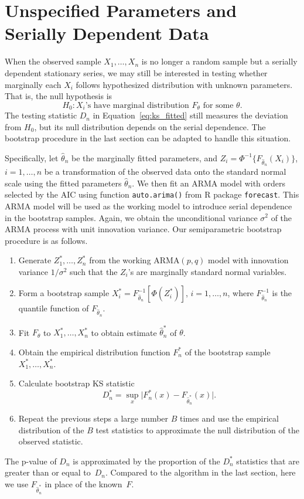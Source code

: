 \documentclass[12pt, letterpaper, titlepage]{article}
\begin{document}
\section{Unspecified Parameters and Serially Dependent Data}
\label{sec:fittedwithdependence}

When the observed sample $X_1, \ldots, X_n$ is no longer a random sample but
a serially dependent stationary series, we may still be interested in testing
whether marginally each $X_i$ follows hypothesized distribution with unknown
parameters. That is, the null hypothesis is
\[
H_0: \text{$X_i$'s have marginal distribution $F_\theta$ for some $\theta$}.
\]
The testing statistic $D_n$ in Equation~\eqref{eq:ks_fitted} still measures the
deviation from $H_0$, but its null distribution depends on the serial
dependence. The bootstrap procedure in the last section can be adapted to handle
this situation.


Specifically, let $\hat\theta_n$ be the marginally fitted parameters, and
$Z_i = \Phi^{-1} \{F_{\hat\theta_n}(X_i)\}$, $i = 1, \ldots, n$ be a
transformation of the observed data onto the standard normal scale using the
fitted parameters $\hat\theta_n$. We then fit an ARMA model with orders
selected by the AIC using function \texttt{auto.arima()} from R package
\texttt{forecast}. This ARMA model will be used as the working model to
introduce serial dependence in the bootstrap samples. Again, we obtain the
unconditional variance $\sigma^2$ of the ARMA process with unit innovation
variance. Our semiparametric bootstrap procedure is as follows.

\begin{enumerate}
\item
  Generate $Z_1^*, \ldots, Z_n^*$ from the working ARMA$(p, q)$ model with
  innovation variance $1 / \sigma^2$ such that the $Z_i$'s are marginally
  standard normal variables.
\item
  Form a bootstrap sample
  $X_i^* = F_{\hat\theta_n}^{-1} [\Phi(Z_i^*)]$, $i = 1, \ldots, n$, where
  $F_{\hat\theta_n}^{-1}$ is the quantile function of $F_{\hat\theta_n}$.
\item
  Fit $F_\theta$ to $X_1^*, \ldots, X_n^*$ to obtain estimate $\hat\theta_n^*$
  of $\theta$.
\item
  Obtain the empirical distribution function $F_n^*$ of the bootstrap sample
  $X_1^*, \ldots, X_n^*$.
\item
  Calculate bootstrap KS statistic
  \[
    D_n^* = \sup_x \lvert F_n^* (x) - F_{\hat\theta_n^*} (x) \rvert.
  \]
\item
  Repeat the previous steps a large number $B$ times and use the empirical
  distribution of the $B$ test statistics to approximate
  the null distribution of the observed statistic.
\end{enumerate}
The p-value of $D_n$ is approximated by the proportion of the $D_n^*$
statistics that are greater than or equal to~$D_n$. Compared to the algorithm in
the last section, here we use $F_{\hat\theta_n^*}$ in place of the known~$F$.
\end{document}

